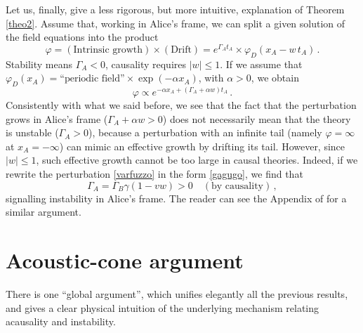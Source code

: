 \documentclass[a4paper, amsfonts, amssymb, amsmath, reprint, showkeys,  twoside, onecolumn,notitlepage,nofootinbib]{revtex4-1}
\theoremstyle{definition}
\theoremstyle{theorem}
\begin{document}
Let us, finally, give a less rigorous, but more intuitive, explanation of Theorem \ref{theo2}. Assume that, working in Alice's frame, we can split a given solution of the field equations into the product
\begin{equation}
\varphi = (\text{Intrinsic growth}) \times (\text{Drift}) = e^{\Gamma_A t_A} \times \varphi_D(x_A-w \, t_A) \, .
\end{equation}
Stability means $\Gamma_A <0$, causality requires $|w| \leq 1$. If we assume that $\varphi_D(x_A)=\text{``periodic field''} \times \exp(-\alpha x_A)$, with $\alpha>0$, we obtain
\begin{equation}\label{gagugo}
\varphi \propto e^{-\alpha x_A + (\Gamma_A+\alpha w)t_A} \, .
\end{equation}
Consistently with what we said before, we see that the fact that the perturbation grows in Alice's frame ($\Gamma_A +\alpha w>0$) does not necessarily mean that the theory is unstable ($\Gamma_A>0$), because a perturbation with an infinite tail (namely $\varphi =\infty$ at $x_A=-\infty$) can mimic an effective growth by drifting its tail. However, since $|w| \leq 1$, such effective growth cannot be too large in causal theories. Indeed, if we rewrite the perturbation \eqref{varfuzzo} in the form \eqref{gagugo}, we find that
\begin{equation}
\Gamma_A = \Gamma_B \gamma (1-vw) >0 \quad (\text{by causality}) \, ,
\end{equation}
signalling instability in Alice's frame. The reader can see the Appendix of \citet{GavassinoLyapunov_2020} for a similar argument.










\section{Acoustic-cone argument}\label{unishiipunti}

There is one ``global argument'', which unifies elegantly all the previous results, and gives a clear physical intuition of the underlying mechanism relating acausality and instability.
\end{document}
